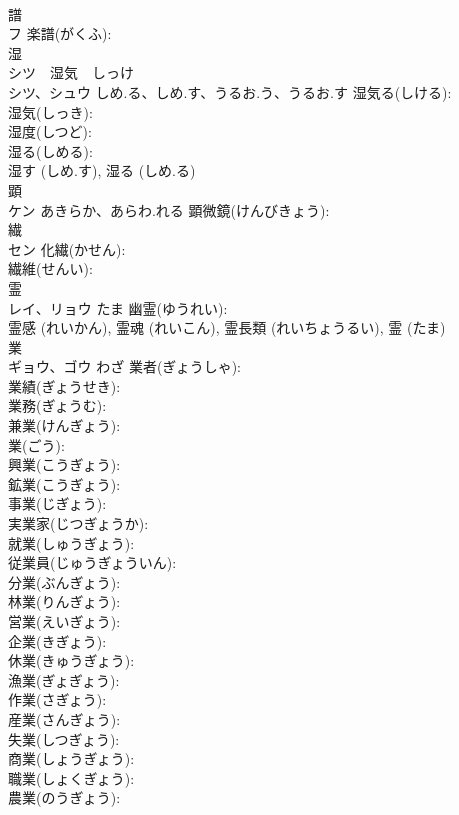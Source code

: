 \documentclass[8pt]{extreport}
\begin{document}
\begin{CJK}{UTF8}{min}
\\	譜			
\\	フ		楽譜(がくふ): 
\\	湿			
\\	シツ　湿気　しっけ
\\	シツ、シュウ	しめ.る、しめ.す、うるお.う、うるお.す	湿気る(しける): 
\\	湿気(しっき): 
\\	湿度(しつど): 
\\	湿る(しめる): 
\\	湿す (しめ.す), 湿る (しめ.る)
\\	顕			
\\	ケン	あきらか、あらわ.れる	顕微鏡(けんびきょう): 
\\	繊			
\\	セン		化繊(かせん): 
\\	繊維(せんい): 
\\	霊			
\\	レイ、リョウ	たま	幽霊(ゆうれい): 
\\	霊感 (れいかん), 霊魂 (れいこん), 霊長類 (れいちょうるい), 霊 (たま)
\\	業			
\\	ギョウ、ゴウ	わざ	業者(ぎょうしゃ): 
\\	業績(ぎょうせき): 
\\	業務(ぎょうむ): 
\\	兼業(けんぎょう): 
\\	業(ごう): 
\\	興業(こうぎょう): 
\\	鉱業(こうぎょう): 
\\	事業(じぎょう): 
\\	実業家(じつぎょうか): 
\\	就業(しゅうぎょう): 
\\	従業員(じゅうぎょういん): 
\\	分業(ぶんぎょう): 
\\	林業(りんぎょう): 
\\	営業(えいぎょう): 
\\	企業(きぎょう): 
\\	休業(きゅうぎょう): 
\\	漁業(ぎょぎょう): 
\\	作業(さぎょう): 
\\	産業(さんぎょう): 
\\	失業(しつぎょう): 
\\	商業(しょうぎょう): 
\\	職業(しょくぎょう): 
\\	農業(のうぎょう): 

\end{CJK}
\end{document}
